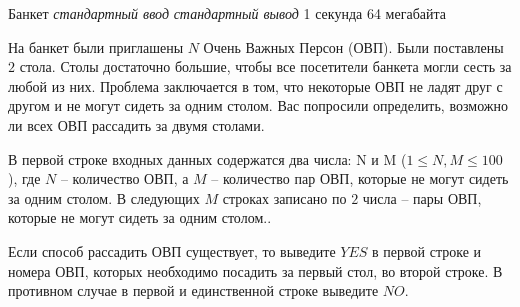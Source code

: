 \begin{problem}%
{Банкет}%
{\textsl{стандартный ввод}}%
{\textsl{стандартный вывод}}%
{1 секунда}%
{64 мегабайта}{}

На банкет были приглашены $N$ Очень Важных Персон (ОВП). Были поставлены $2$ стола. Столы достаточно большие, чтобы все посетители банкета могли сесть за любой из них. Проблема заключается в том, что некоторые ОВП не ладят друг с другом и не могут сидеть за одним столом. Вас попросили определить, возможно ли всех ОВП рассадить за двумя столами.

\InputFile

В первой строке входных данных содержатся два числа: N и M ($1 \leqslant N, M \leqslant 100$), где $N$ – количество ОВП, а $M$ – количество пар ОВП, которые не могут сидеть за одним столом. В следующих $M$ строках записано по $2$ числа – пары ОВП, которые не могут сидеть за одним столом..

\OutputFile

Если способ рассадить ОВП существует, то  выведите $YES$ в первой строке и номера ОВП, которых необходимо посадить за первый стол, во второй строке. В противном случае в первой и единственной строке выведите $NO$.

\Examples

\begin{example}
%
\end{example}
\end{problem}
